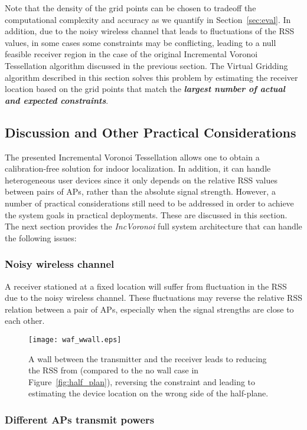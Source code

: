 \documentclass[conference]{IEEEtran}
\def \sys {\textit{IncVoronoi}}
\begin{document}
Note that the density of the grid points can be chosen to tradeoff the computational complexity and accuracy as we quantify in Section~\ref{sec:eval}. In addition, due to the noisy wireless channel that leads to fluctuations of the RSS values, in some cases some constraints may be conflicting, leading to a null feasible receiver region in the case of the original Incremental Voronoi Tessellation algorithm discussed in the previous section. The Virtual Gridding algorithm described in this section solves this problem by estimating the receiver location based on the  grid points that match the \textbf{\emph{largest number of actual and expected constraints}}.
\subsection{Discussion and Other Practical Considerations}
The presented Incremental Voronoi Tessellation allows one to obtain a calibration-free solution for indoor localization. In addition, it can handle heterogeneous user devices since it only depends on the relative RSS values between pairs of APs, rather than the absolute signal strength.
However, a number of practical considerations still need to be addressed in order to achieve the system goals in practical deployments. These are discussed in this section. The next section provides the \sys{} full system architecture that can handle the following issues:

\subsubsection{Noisy wireless channel}
A receiver stationed at a fixed location will suffer from fluctuation in the RSS due to the noisy wireless channel. These fluctuations may reverse the relative RSS relation between a pair of APs, especially when the signal strengths are close to each other.
\begin{figure}[!t]
    \texttt{[image: waf\_wwall.eps]}
\caption{A wall between the transmitter  and the receiver leads to reducing the RSS from  (compared to the no wall case in Figure~\ref{fig:half_plan}), reversing the constraint and leading to estimating the device location on the wrong side of the half-plane.}
\label{fig:waf_effect}
\end{figure}
\subsubsection{Different APs transmit powers} 
\end{document}
